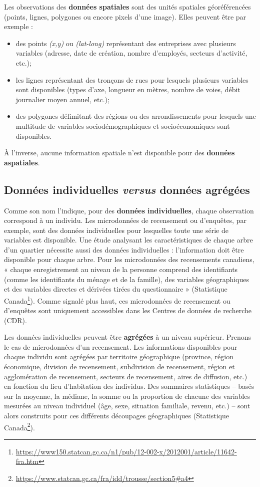 \documentclass[
  11pt,
  french,
]{book}
\providecommand{\tightlist}{%
  \setlength{\itemsep}{0pt}\setlength{\parskip}{0pt}}
\renewcommand{\href}[2]{#2\footnote{\url{#1}}}
\begin{document}
Les observations des \textbf{données spatiales} sont des unités spatiales géoréférencées (points, lignes, polygones ou encore pixels d'une image). Elles peuvent être par exemple :

\begin{itemize}
\tightlist
\item
  des points \emph{(x,y)} ou \emph{(lat-long)} représentant des entreprises avec plusieurs variables (adresse, date de création, nombre d'employés, secteurs d'activité, etc.);
\item
  les lignes représentant des tronçons de rues pour lesquels plusieurs variables sont disponibles (types d'axe, longueur en mètres, nombre de voies, débit journalier moyen annuel, etc.);
\item
  des polygones délimitant des régions ou des arrondissements pour lesquels une multitude de variables sociodémographiques et socioéconomiques sont disponibles.
\end{itemize}

À l'inverse, aucune information spatiale n'est disponible pour des \textbf{données aspatiales}.

\hypertarget{sect0224}{%
\subsection{\texorpdfstring{Données individuelles \emph{versus} données agrégées}{Données individuelles versus données agrégées}}\label{sect0224}}

Comme son nom l'indique, pour des \textbf{données individuelles}, chaque observation correspond à un individu. Les microdonnées de recensement ou d'enquêtes, par exemple, sont des données individuelles pour lesquelles toute une série de variables est disponible. Une étude analysant les caractéristiques de chaque arbre d'un quartier nécessite aussi des données individuelles : l'information doit être disponible pour chaque arbre. Pour les microdonnées des recensements canadiens, « chaque enregistrement au niveau de la personne comprend des identifiants (comme les identifiants du ménage et de la famille), des variables géographiques et des variables directes et dérivées tirées du questionnaire » (\href{https://www150.statcan.gc.ca/n1/pub/12-002-x/2012001/article/11642-fra.htm}{Statistique Canada}). Comme signalé plus haut, ces microdonnées de recensement ou d'enquêtes sont uniquement accessibles dans les Centres de données de recherche (CDR).

Les données individuelles peuvent être \textbf{agrégées} à un niveau supérieur. Prenons le cas de microdonnées d'un recensement. Les informations disponibles pour chaque individu sont agrégées par territoire géographique (province, région économique, division de recensement, subdivision de recensement, région et agglomération de recensement, secteurs de recensement, aires de diffusion, etc.) en fonction du lieu d'habitation des individus. Des sommaires statistiques -- basés sur la moyenne, la médiane, la somme ou la proportion de chacune des variables mesurées au niveau individuel (âge, sexe, situation familiale, revenu, etc.) -- sont alors construits pour ces différents découpages géographiques (\href{https://www.statcan.gc.ca/fra/idd/trousse/section5\#a4}{Statistique Canada}).
\end{document}
